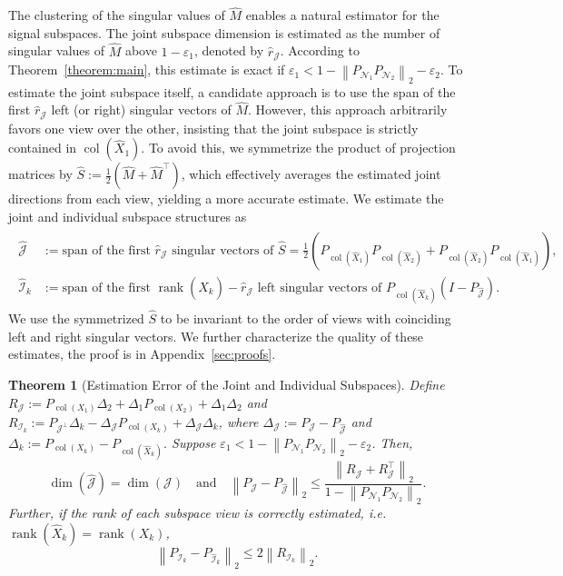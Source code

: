 \documentclass{amsart}
\DeclareMathOperator*{\col}{col}
\DeclareMathOperator*{\rank}{rank}
\newcommand{\Ncal}{\mathcal{N}}
\newcommand{\Jcal}{\mathcal{J}}
\newcommand{\Ical}{\mathcal{I}}
\newtheorem{theorem}{Theorem}[section]
\begin{document}
The clustering of the singular values of $\widehat{M}$ enables a natural estimator for the signal subspaces. The joint subspace dimension is estimated as the number of singular values of $\widehat{M}$ above $1-\varepsilon_1$, denoted by $\widehat{r}_{\Jcal}$. According to Theorem~\ref{theorem:main}, this estimate is exact if $\varepsilon_1 < 1-\left\|P_{\Ncal_1} P_{\Ncal_2}\right\|_2-\varepsilon_2$. To estimate the joint subspace itself, a candidate approach is to use the span of the first $\widehat{r}_{\Jcal}$ left (or right) singular vectors of $\widehat{M}$. However, this approach arbitrarily favors one view over the other, insisting that the joint subspace is strictly contained in $\col (\widehat{X}_1)$. To avoid this, we symmetrize the product of projection matrices by $\widehat{S} := \frac{1}{2}(\widehat{M} + \widehat{M}^\top)$, which effectively averages the estimated joint directions from each view, yielding a more accurate estimate. We estimate the joint and individual subspace structures as
    \begin{eqnarray}
    \begin{aligned}
        \widehat{\Jcal} &:= \text{span of the first } \widehat{r}_{\Jcal} \text{ singular vectors of }\widehat{S} = \frac12\left(P_{\col (\widehat{X}_1)} P_{\col (\widehat{X}_2)} + P_{\col (\widehat{X}_2)}P_{\col (\widehat{X}_1)} \right),\\
        \widehat{\Ical}_k &:= \text{span of the first } \rank(\widehat{X}_k)-\widehat{r}_{\Jcal} \text{ left singular vectors of }P_{\col(\widehat{X}_k)}(I-P_{\widehat{\Jcal}}).
        \end{aligned}
        \label{eqn:estimated_subspaces}
    \end{eqnarray}
{ We use the symmetrized $\widehat{S}$ to be invariant to the order of views with coinciding left and right singular vectors.}
We further characterize the quality of these estimates, the proof is in Appendix~\ref{sec:proofs}. 
\begin{theorem}[Estimation Error of the Joint and Individual Subspaces]
\label{thm:subspace_est}
Define ${R}_{\Jcal} := P_{\col(X_1)} \Delta_2 + \Delta_1 P_{\col(X_2)} + \Delta_1 \Delta_2$ and  {$R_{\Ical_k} := P_{\Jcal^\perp} \Delta_k - \Delta_{\Jcal} P_{\col(X_k)}+ \Delta_{\Jcal} \Delta_k$}, where {$\Delta_{\Jcal} :=  P_{\Jcal} - P_{\widehat{\Jcal}}$} and $\Delta_k := P_{{\col (X_k)}} - P_{\col (\widehat{X}_k)}$. Suppose $\varepsilon_1 < 1-\left\|P_{\Ncal_1} P_{\Ncal_2}\right\|_2-\varepsilon_2$. Then, 
$$\dim(\widehat{\Jcal}) = \dim(\Jcal) \quad \text{and}\quad\left\| P_{\Jcal} - P_{\widehat{\Jcal}} \right\|_2 \leq  \frac{ {} \left\|R_{\Jcal} + R^\top_{\Jcal}\right\|_2}{1-\left\|P_{\Ncal_1} P_{\Ncal_2}\right\|_2}.$$ Further, if the rank of each subspace view is correctly estimated, i.e. $\rank(\widehat{X}_k) = \rank(X_k)$,
$$\left\|P_{\Ical_k} - P_{\widehat{\Ical}_k}\right\|_2 \leq {2}\left\|R_{\Ical_k}\right\|_2.$$
\end{theorem}
\end{document}
